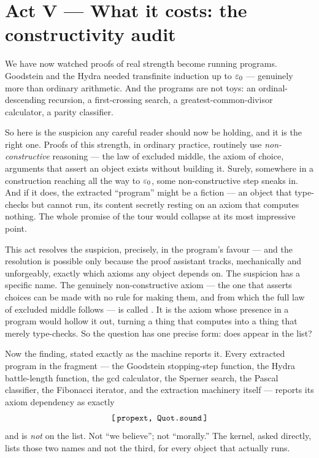 \documentclass[11pt]{article}
\begin{document}
\section{Act V --- What it costs: the constructivity audit}

We have now watched proofs of real strength become running programs. Goodstein
and the Hydra needed transfinite induction up to $\varepsilon_0$ --- genuinely more than
ordinary arithmetic. And the programs are not toys: an ordinal-descending
recursion, a first-crossing search, a greatest-common-divisor calculator, a
parity classifier.

So here is the suspicion any careful reader should now be holding, and it is the
right one. Proofs of this strength, in ordinary practice, routinely use
\emph{non-constructive} reasoning --- the law of excluded middle, the axiom of
choice, arguments that assert an object exists without building it. Surely,
somewhere in a construction reaching all the way to $\varepsilon_0$, some
non-constructive step sneaks in. And if it does, the extracted ``program'' might
be a fiction --- an object that type-checks but cannot run, its content secretly
resting on an axiom that computes nothing. The whole promise of the tour would
collapse at its most impressive point.

This act resolves the suspicion, precisely, in the program's favour --- and the
resolution is possible only because the proof assistant tracks, mechanically and
unforgeably, exactly which axioms any object depends on. The suspicion has a
specific name. The genuinely non-constructive axiom --- the one that asserts
choices can be made with no rule for making them, and from which the full law of
excluded middle follows --- is called . It is the axiom
whose presence in a program would hollow it out, turning a thing that computes
into a thing that merely type-checks. So the question has one precise form: does
 appear in the list?

Now the finding, stated exactly as the machine reports it. Every extracted
program in the fragment --- the Goodstein stopping-step function, the
Hydra battle-length function, the gcd calculator, the Sperner search, the Pascal
classifier, the Fibonacci iterator, and the extraction machinery itself ---
reports its axiom dependency as exactly
\[
  \texttt{[\,propext,\ Quot.sound\,]}
\]
and  is \emph{not} on the list. Not ``we believe''; not
``morally.'' The kernel, asked directly, lists those two names and not the
third, for every object that actually runs.
\end{document}
